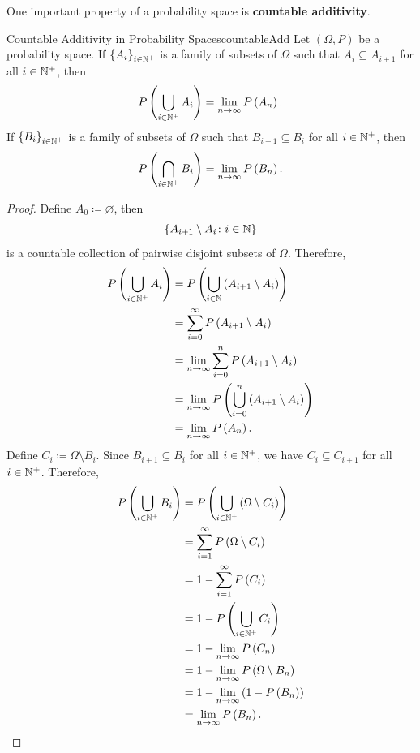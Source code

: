 \documentclass[math]{amznotes}
\theoremstyle{remark}
\newcommand{\0}{\mathbf{0}}
\newcommand{\1}{\mathbf{1}}
\begin{document}
One important property of a probability space is \textbf{countable additivity}. 
\begin{probox}{Countable Additivity in Probability Spaces}{countableAdd}
    Let $\left(\Omega, P\right)$ be a probability space. If $\left\{A_i\right\}_{i \in \mathbb{N}^+}$ is a family of subsets of $\Omega$ such that $A_i \subseteq A_{i + 1}$ for all $i \in \mathbb{N}^+$, then 
    \begin{equation*}
        P\left(\bigcup_{i \in \mathbb{N}^+}A_i\right) = \lim_{n \to \infty}P\left(A_n\right).
    \end{equation*}
    If $\left\{B_i\right\}_{i \in \mathbb{N}^+}$ is a family of subsets of $\Omega$ such that $B_{i + 1} \subseteq B_i$ for all $i \in \mathbb{N}^+$, then 
    \begin{equation*}
        P\left(\bigcap_{i \in \mathbb{N}^+}B_i\right) = \lim_{n \to \infty}P\left(B_n\right).
    \end{equation*}
    \tcblower
    \begin{proof}
        Define $A_0 \coloneqq \varnothing$, then 
        \begin{equation*}
            \left\{A_{i + 1} \setminus A_i \colon i \in \mathbb{N}\right\}
        \end{equation*}
        is a countable collection of pairwise disjoint subsets of $\Omega$. Therefore, 
        \begin{align*}
            P\left(\bigcup_{i \in \mathbb{N}^+}A_i\right) & = P\left(\bigcup_{i \in \mathbb{N}}\left(A_{i + 1} \setminus A_i\right)\right) \\
            & = \sum_{i = 0}^{\infty}P\left(A_{i + 1}\setminus A_i\right) \\
            & = \lim_{n \to \infty}\sum_{i = 0}^{n}P\left(A_{i + 1}\setminus A_i\right) \\
            & = \lim_{n \to \infty}P\left(\bigcup_{i = 0}^n\left(A_{i + 1}\setminus A_i\right)\right) \\
            & = \lim_{n \to \infty}P\left(A_n\right).
        \end{align*}
        Define $C_i \coloneqq \Omega \setminus B_i$. Since $B_{i + 1} \subseteq B_i$ for all $i \in \mathbb{N}^+$, we have $C_{i} \subseteq C_{i + 1}$ for all $i \in \mathbb{N}^+$. Therefore, 
        \begin{align*}
            P\left(\bigcup_{i \in \mathbb{N}^+}B_i\right) & = P\left(\bigcup_{i \in \mathbb{N}^+}\left(\Omega\setminus C_i\right)\right) \\
            & = \sum_{i = 1}^{\infty}P\left(\Omega \setminus C_i\right) \\
            & = 1 - \sum_{i = 1}^{\infty}P\left(C_i\right) \\
            & = 1 - P\left(\bigcup_{i \in \mathbb{N}^+} C_i\right) \\
            & = 1 - \lim_{n \to \infty}P\left(C_n\right) \\
            & = 1 - \lim_{n \to \infty}P\left(\Omega \setminus B_n\right) \\
            & = 1 - \lim_{n \to \infty}\left(1 - P\left(B_n\right)\right) \\
            & = \lim_{n \to \infty}P\left(B_n\right).
        \end{align*}
    \end{proof}
\end{probox}
\end{document}
